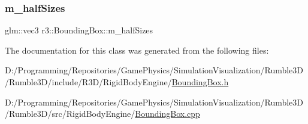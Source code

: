 \subsubsection{\texorpdfstring{m\+\_\+half\+Sizes}{m\_halfSizes}}
{\footnotesize\ttfamily glm\+::vec3 r3\+::\+Bounding\+Box\+::m\+\_\+half\+Sizes\hspace{0.3cm}{\ttfamily [protected]}}



The documentation for this class was generated from the following files\+:\begin{DoxyCompactItemize}
\item 
D\+:/\+Programming/\+Repositories/\+Game\+Physics/\+Simulation\+Visualization/\+Rumble3\+D/\+Rumble3\+D/include/\+R3\+D/\+Rigid\+Body\+Engine/\mbox{\hyperlink{_bounding_box_8h}{Bounding\+Box.\+h}}\item 
D\+:/\+Programming/\+Repositories/\+Game\+Physics/\+Simulation\+Visualization/\+Rumble3\+D/\+Rumble3\+D/src/\+Rigid\+Body\+Engine/\mbox{\hyperlink{_bounding_box_8cpp}{Bounding\+Box.\+cpp}}\end{DoxyCompactItemize}
